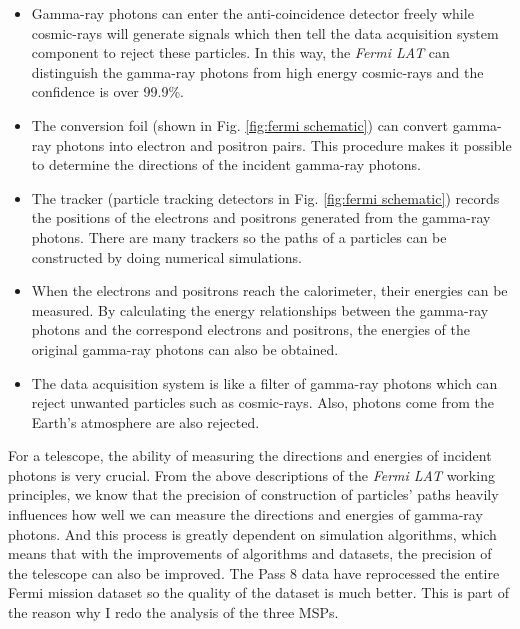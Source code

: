 \documentclass[12pt]{report}
\begin{document}
      \begin{itemize}
        \item Gamma-ray photons can enter the anti-coincidence detector freely while 
          cosmic-rays will generate signals which then tell the data acquisition system 
          component to reject these particles. In this way, the \textit{Fermi LAT} can 
          distinguish the gamma-ray photons from high energy cosmic-rays and the confidence 
          is over 99.9\%. 
        \item The conversion foil (shown in Fig. \ref{fig:fermi schematic}) can convert  
          gamma-ray photons into electron and positron pairs. This procedure makes it 
          possible to determine the directions of the incident gamma-ray photons. 
        \item The tracker (particle tracking detectors in Fig. \ref{fig:fermi schematic}) 
          records the positions of the electrons and positrons generated from the gamma-ray 
          photons. There are many trackers so the paths of a particles can be constructed by 
          doing numerical simulations.
        \item When the electrons and positrons reach the calorimeter, their energies can be
          measured. By calculating the energy relationships between the gamma-ray photons and 
          the correspond electrons and positrons, the energies of the original gamma-ray 
          photons can also be obtained. 
        \item The data acquisition system is like a filter of gamma-ray photons which can 
          reject unwanted particles such as cosmic-rays. Also, photons come from the Earth's 
          atmosphere are also rejected. 
      \end{itemize}

      For a telescope, the ability of measuring the directions and energies of incident 
      photons is very crucial. From the above descriptions of the \textit{Fermi LAT} 
      working principles, we know that the precision of construction of particles' paths 
      heavily influences how well we can measure the directions and energies of gamma-ray 
      photons. And this process is greatly dependent on simulation algorithms, which means 
      that with the improvements of algorithms and datasets,
      the precision of the telescope can also be improved. The Pass 8 data 
      have reprocessed the entire Fermi mission dataset so the quality of the dataset is much 
      better. This is part of the reason why I redo the analysis of the three MSPs.
\end{document}
